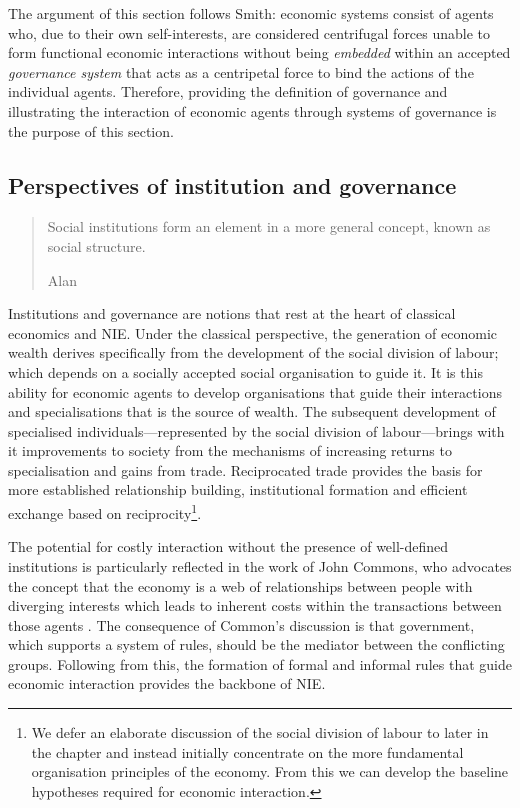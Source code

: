 The argument of this section follows Smith: economic systems consist of agents who, due to their own self-interests, are considered centrifugal forces unable to form functional economic interactions without being \emph{embedded} within an accepted \emph{governance system} that acts as a centripetal force to bind the actions of the individual agents. Therefore, providing the definition of governance and illustrating the interaction of economic agents through systems of governance is the purpose of this section.

\subsection{Perspectives of institution and governance}

\begin{quote}
Social institutions form an element in a more general concept, known as social structure.

\begin{flushright}
Alan \citet[p.~3]{Wells1970}
\end{flushright}
\end{quote}

Institutions and governance are notions that rest at the heart of classical economics and NIE. Under the classical perspective, the generation of economic wealth derives specifically from the development of the social division of labour; which depends on a socially accepted social organisation to guide it. It is this ability for economic agents to develop organisations that guide their interactions and specialisations that is the source of wealth. The subsequent development of specialised individuals---represented by the social division of labour---brings with it improvements to society from the mechanisms of increasing returns to specialisation and gains from trade. Reciprocated trade provides the basis for more established relationship building, institutional formation and efficient exchange based on reciprocity\footnote{We defer an elaborate discussion of the social division of labour to later in the chapter and instead initially concentrate on the more fundamental organisation principles of the economy. From this we can develop the baseline hypotheses required for economic interaction.}.

The potential for costly interaction without the presence of well-defined institutions is particularly reflected in the work of John Commons, who advocates the concept that the economy is a web of relationships between people with diverging interests which leads to inherent costs within the transactions between those agents \citep{Commons1931, Commons1934}. The consequence of Common's discussion is that government, which supports a system of rules, should be the mediator between the conflicting groups. Following from this, the formation of formal and informal rules that guide economic interaction provides the backbone of NIE. 

